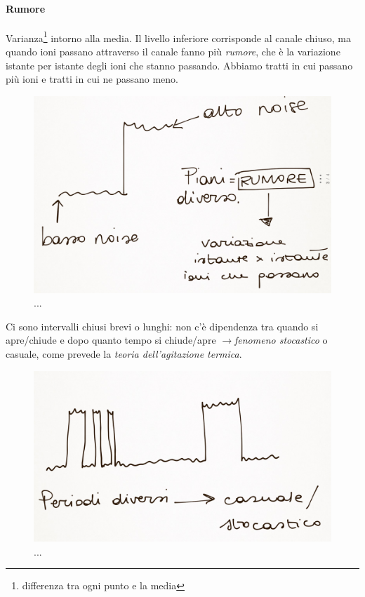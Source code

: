 \documentclass[a4paper,12pt]{article}
\newcommand{\lfreccia}{\ensuremath{\longrightarrow}}
\begin{document}
\paragraph{Rumore}
Varianza\footnote{differenza tra ogni punto e la media} intorno alla media. Il livello inferiore corrisponde al canale chiuso, ma quando ioni passano attraverso il canale fanno più \emph{rumore}, che è la variazione istante per istante degli ioni che stanno passando. Abbiamo tratti in cui passano più ioni e tratti in cui ne passano meno. 
\begin{figure}[H]
\centering
\includegraphics[scale=0.1]{immagine/3.jpg}
\caption{...}
\end{figure}

Ci sono intervalli chiusi brevi o lunghi: non c'è dipendenza tra quando si apre/chiude e dopo quanto tempo si chiude/apre \lfreccia \emph{fenomeno stocastico} o casuale, come prevede la \emph{teoria dell'agitazione termica}.

\begin{figure}[H]
\centering
\includegraphics[scale=0.1]{immagine/4.jpg}
\caption{...}
\end{figure}
\end{document}
